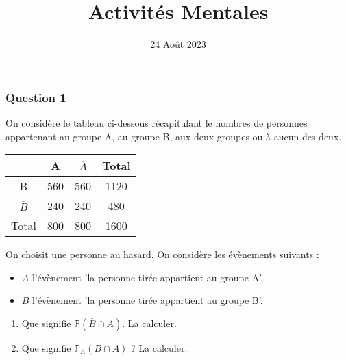 \documentclass[15pt, mathserif]{beamer}
\title{Activités Mentales}
\date{24 Août 2023}
\begin{document}
\begin{frame}
    \titlepage
\end{frame}

\begin{frame} 
	\frametitle{Question 1}
On considère le tableau ci-dessous récapitulant le nombres de personnes appartenant au groupe A, au groupe B, aux deux groupes ou à aucun des deux.\begin{center} 
 \begin{tabular}{|c|c|c|c|} 
 \cline{2-4} 
 \multicolumn{1}{c|}{} & A & $\overline{A}$ & Total \\\hline 
 B   &560  &560& 1120 \\\hline 
 $\overline{B}$   &240 & 240 & 480 \\\hline 
 Total   &800&800 &1600 \\\hline  
 \end{tabular} 
 \end{center} On choisit une personne au hasard. On considère les évènements suivants : 
 \begin{itemize} 
 \item $A$ l'évènement 'la personne tirée appartient au groupe A'. 
 \item $B$ l'évènement 'la personne tirée appartient au groupe B'. 
 \end{itemize} 
 \begin{enumerate} 
 \item Que signifie  $\mathbb{P}(\overline{B} \cap A)$. La calculer. 
 \item Que signifie $\mathbb{P}_{A} (B \cap A)$ ? La calculer. 
  \end{enumerate} 
 \end{frame}
\end{document}
